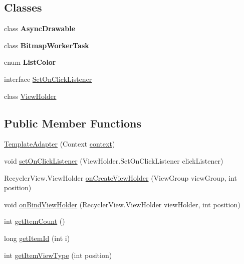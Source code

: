 \subsection*{Classes}
\begin{DoxyCompactItemize}
\item 
class {\bfseries Async\+Drawable}
\item 
class {\bfseries Bitmap\+Worker\+Task}
\item 
enum {\bfseries List\+Color}
\item 
interface \hyperlink{interfaceorg_1_1buildmlearn_1_1toolkit_1_1adapter_1_1TemplateAdapter_1_1SetOnClickListener}{Set\+On\+Click\+Listener}
\item 
class \hyperlink{classorg_1_1buildmlearn_1_1toolkit_1_1adapter_1_1TemplateAdapter_1_1ViewHolder}{View\+Holder}
\end{DoxyCompactItemize}
\subsection*{Public Member Functions}
\begin{DoxyCompactItemize}
\item 
\hyperlink{classorg_1_1buildmlearn_1_1toolkit_1_1adapter_1_1TemplateAdapter_a39f071351048d858b84375b76c1cc8e1}{Template\+Adapter} (Context \hyperlink{classorg_1_1buildmlearn_1_1toolkit_1_1adapter_1_1TemplateAdapter_a848684b0dd6cc43c279f4dde513346ea}{context})
\item 
void \hyperlink{classorg_1_1buildmlearn_1_1toolkit_1_1adapter_1_1TemplateAdapter_abefb22ca8bf58dcf9fbc5816e97371d6}{set\+On\+Click\+Listener} (View\+Holder.\+Set\+On\+Click\+Listener click\+Listener)
\item 
Recycler\+View.\+View\+Holder \hyperlink{classorg_1_1buildmlearn_1_1toolkit_1_1adapter_1_1TemplateAdapter_a83a2c83ea4e90fc5aed6a68d2ccb1157}{on\+Create\+View\+Holder} (View\+Group view\+Group, int position)
\item 
void \hyperlink{classorg_1_1buildmlearn_1_1toolkit_1_1adapter_1_1TemplateAdapter_a56ea041378f37dbf5270f69dab26f5a2}{on\+Bind\+View\+Holder} (Recycler\+View.\+View\+Holder view\+Holder, int position)
\item 
int \hyperlink{classorg_1_1buildmlearn_1_1toolkit_1_1adapter_1_1TemplateAdapter_ad79c3f5f747a7f83e5f8d929b1c46089}{get\+Item\+Count} ()
\item 
long \hyperlink{classorg_1_1buildmlearn_1_1toolkit_1_1adapter_1_1TemplateAdapter_af7269011268e606de6d4c841d349149f}{get\+Item\+Id} (int i)
\item 
int \hyperlink{classorg_1_1buildmlearn_1_1toolkit_1_1adapter_1_1TemplateAdapter_a014c57ad6432bfc5f9566caf1edf1e76}{get\+Item\+View\+Type} (int position)
\end{DoxyCompactItemize}
